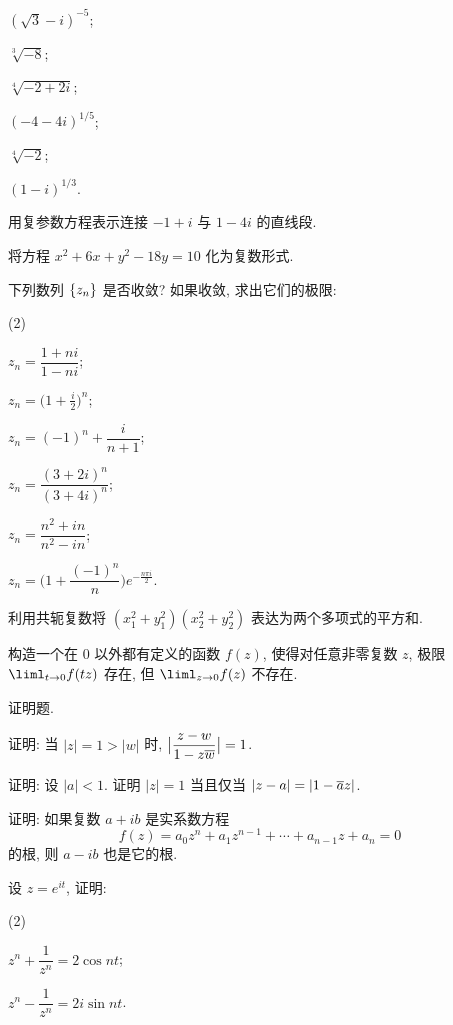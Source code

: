 \begin{homework}
\begin{subex}
\begin{subsubex}
      \item $(\sqrt3-i)^{-5}$;
      \item $\sqrt[3]{-8}$;
      \item $\sqrt[4]{-2+2i}$;
      \item $(-4-4i)^{1/5}$;
      \item $\sqrt[4]{-2}$;
      \item $(1-i)^{1/3}$.
    \end{subsubex}
    \item 用复参数方程表示连接 $-1+i$ 与 $1-4i$ 的直线段.
    \item 将方程 $x^2+6x+y^2-18y=10$ 化为复数形式.
    \item 下列数列 ${\left\{z_n\right\}}$ 是否收敛? 如果收敛, 求出它们的极限:
    \begin{subsubex}(2)
      \item $z_n=\dfrac{1+ni}{1-ni}$;
      \item $\displaystyle z_n=\bigl(1+\frac i2\bigr)^n$;
      \item $z_n=(-1)^n+\dfrac{i}{n+1}$;
      \item $z_n=\dfrac{(3+2i)^n}{(3+4i)^n}$;
      \item $z_n=\dfrac{n^2+in}{n^2-in}$;
      \item $z_n=\bigl(1+\dfrac{(-1)^n}n\bigr)e^{-\frac{n\pi i}2}$.
    \end{subsubex}
    \item 利用共轭复数将 $(x_1^2+y_1^2)(x_2^2+y_2^2)$ 表达为两个多项式的平方和.
    \item 构造一个在 $0$ 以外都有定义的函数 $f(z)$, 使得对任意非零复数 $z$, 极限 $\liml_{t\to0}f(tz)$ 存在, 但 $\liml_{z\to0}f(z)$ 不存在.
  \end{subex}
  \item 证明题.
  \begin{subex}
    \item 证明: 当 $|z|=1>|w|$ 时, $\bigl|\dfrac{z-w}{1-z\overline w}\bigr|=1$.
    \item 证明: 设 $|a|<1$. 证明 $|z|=1$ 当且仅当 $|z-a|=|1-\overline az|$.
    \item 证明: 如果复数 $a+ib$ 是实系数方程
      \[f(z)=a_0z^n+a_1z^{n-1}+\cdots+a_{n-1}z+a_n=0\]
      的根, 则 $a-ib$ 也是它的根.
    \item 设 $z=e^{it}$, 证明:\begin{tasksexam}(2)
      \item $z^n+\dfrac1{z^n}=2\cos{nt}$;
      \item $z^n-\dfrac1{z^n}=2i\sin{nt}$.
    \end{tasksexam}

\end{subex}
\end{homework}
